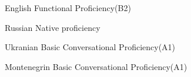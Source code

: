 
\begin{cvskills}

  \cvskill
    {English} %
    {Functional Proficiency(B2)} %

  \cvskill
    {Russian} %
    {Native proficiency} %

  \cvskill
    {Ukranian} %
    {Basic Conversational Proficiency(A1)} %

  \cvskill
    {Montenegrin} %
    {Basic Conversational Proficiency(A1)}


\end{cvskills}
